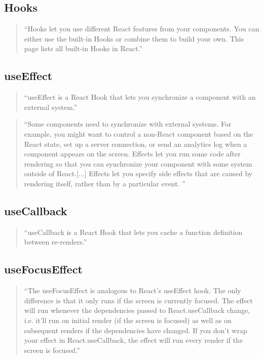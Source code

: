 \begin{spacing}{1}
    \subsection{Hooks}\label{subsec:hooks}
    \begin{quotation}
        ``Hooks let you use different React features from your components.
        You can either use the built-in Hooks or combine them to build your own.
        This page lists all built-in Hooks in React.''
        \cite{hooks}
    \end{quotation}

    \subsection{useEffect}\label{subsec:useeffect}
    \begin{quotation}
        ``useEffect is a React Hook that lets you synchronize a component
        with an external system.''~\cite{useEffect}

    \end{quotation}
    \begin{quotation}
        ``Some components need to synchronize with external systems.
        For example, you might want to control a non-React component based on the React state, set up a server connection,
        or send an analytics log when a component appears on the screen.
        Effects let you run some code after rendering so that you can synchronize your component with some system outside of React.[...]
        Effects let you specify side effects that are caused by rendering itself,
        rather than by a particular event. ''
        \cite{Synchronizing-with-effects}


    \end{quotation}


    \subsection{useCallback}\label{subsec:usecallback}
    \begin{quotation}
        ``useCallback is a React Hook that lets you cache a function definition between re-renders.''
        \cite{useCallback}
    \end{quotation}


    \subsection{useFocusEffect}\label{subsec:usefocuseffect}
    \begin{quotation}
        ``The useFocusEffect is analogous to React's useEffect hook. The only difference is that it only runs if the screen
        is currently focused.
        The effect will run whenever the dependencies passed to React.useCallback change,
        i.e. it'll run on initial render (if the screen is focused) as well as on subsequent renders if the dependencies
        have changed. If you don't wrap your effect in React.useCallback, the effect will run every render if the screen
        is focused.'' \cite{useFocusEffect}


\end{quotation}
\end{spacing}
